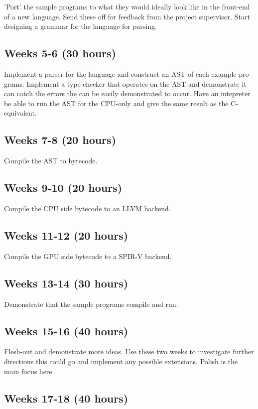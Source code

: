 \documentclass[11pt]{article}
\begin{document}
'Port' the sample programs to what they would ideally look like in the
front-end of a new language. Send these off for feedback from the project
supervisor. Start designing a grammar for the language for parsing.

\subsection{Weeks 5-6 (30 hours)}

Implement a parser for the language and construct an AST of each example pro-
grams. Implement a type-checker that operates on the AST and demonstrate it can
catch the errors the can be easily demonstrated to occur. Have an intepreter be
able to run the AST for the CPU-only and give the same result as the
C-equivalent.

\subsection{Weeks 7-8 (20 hours)}

Compile the AST to bytecode.

\subsection{Weeks 9-10 (20 hours)}

Compile the CPU side bytecode to an LLVM backend.

\subsection{Weeks 11-12 (20 hours)}

Compile the GPU side bytecode to a SPIR-V backend.

\subsection{Weeks 13-14 (30 hours)}

Demonstrate that the sample programs compile and run.

\subsection{Weeks 15-16 (40 hours)}

Flesh-out and demonstrate more ideas. Use these two weeks to investigate
further directions this could go and implement any possible extensions. Polish
is the main focus here.

\subsection{Weeks 17-18 (40 hours)}
\end{document}
